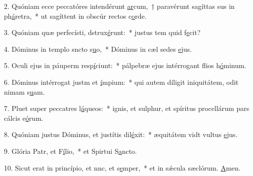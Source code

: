 2. Quóniam ecce peccatóres intendérunt \uline{ar}cum,~† paravérunt sagíttas sus in ph\uline{á}retra,~* ut sagíttent in obscúr rectos c\uline{o}rde.\par 
3. Quóniam quæ perfecísti, dstrux\uline{é}runt:~* justus tem quid f\uline{e}cit?\par 
4. Dóminus in templo sncto s\uline{u}o,~* Dóminus in cæl sedes \uline{e}jus.\par 
5. Oculi ejus in páuperm resp\uline{í}ciunt:~* pálpebræ ejus intérrogant flios h\uline{ó}minum.\par 
6. Dóminus intérrogat justm et \uline{í}mpium:~* qui autem díligit iniquitátem, odit nimam s\uline{u}am.\par 
7. Pluet super peccatres l\uline{á}queos:~* ignis, et sulphur, et spíritus procellárum pars cálcis e\uline{ó}rum.\par 
8. Quóniam justus Dóminus, et justítis dil\uline{é}xit:~* æquitátem vidt vultus \uline{e}jus.\par 
9. Glória Patr, et F\uline{í}lio,~* et Spirtui S\uline{a}ncto.\par 
10. Sicut erat in princípio, et nnc, et s\uline{e}mper,~* et in sǽcula sæclórum. \uline{A}men.\par 
